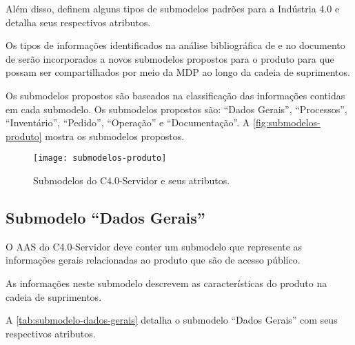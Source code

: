 Além disso,  definem alguns tipos de submodelos padrões para a Indústria 4.0 e detalha seus respectivos atributos.

Os tipos de informações identificados na análise bibliográfica de  e no documento de  serão incorporados a novos submodelos propostos para o produto para que possam ser compartilhados por meio da MDP ao longo da cadeia de suprimentos.

Os submodelos propostos são baseados na classificação das informações contidas em cada submodelo. Os submodelos propostos são: ``Dados Gerais'', ``Processos'', ``Inventário'', ``Pedido'', ``Operação'' e ``Documentação''. A \autoref{fig:submodelos-produto} mostra os submodelos propostos.

\begin{figure}[htb!]
	\centering
	\texttt{[image: submodelos-produto]}
	\caption{Submodelos do C4.0-Servidor e seus atributos.}
	\label{fig:submodelos-produto}
\end{figure}



\subsection{Submodelo ``Dados Gerais''}

O AAS do C4.0-Servidor deve conter um submodelo que represente as informações gerais relacionadas ao produto que são de acesso público.

As informações neste submodelo descrevem as características do produto na cadeia de suprimentos.

A \autoref{tab:submodelo-dados-gerais} detalha o submodelo ``Dados Gerais'' com seus respectivos atributos.

